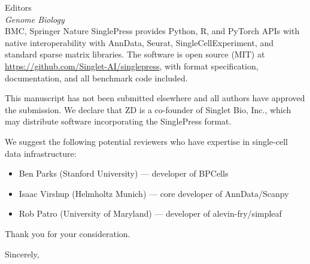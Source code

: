 \documentclass[11pt]{letter}
\begin{document}
\begin{letter}{Editors\\
\textit{Genome Biology}\\
BMC, Springer Nature}
SinglePress provides Python, R, and PyTorch APIs with native interoperability with AnnData, Seurat, SingleCellExperiment, and standard sparse matrix libraries.
The software is open source (MIT) at \url{https://github.com/Singlet-AI/singlepress}, with format specification, documentation, and all benchmark code included.

This manuscript has not been submitted elsewhere and all authors have approved the submission.
We declare that ZD is a co-founder of Singlet Bio, Inc., which may distribute software incorporating the SinglePress format.

We suggest the following potential reviewers who have expertise in single-cell data infrastructure:
\begin{itemize}
\item Ben Parks (Stanford University) --- developer of BPCells
\item Isaac Virshup (Helmholtz Munich) --- core developer of AnnData/Scanpy
\item Rob Patro (University of Maryland) --- developer of alevin-fry/simpleaf
\end{itemize}

Thank you for your consideration.

\closing{Sincerely,}

\end{letter}
\end{document}
